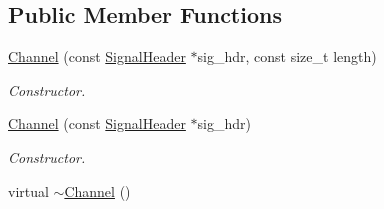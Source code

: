 \subsection*{Public Member Functions}
\begin{DoxyCompactItemize}
\item 
\hypertarget{classgdf_1_1_channel_ac2b2017a6e756749a16af2b9c8509cc0}{
\hyperlink{classgdf_1_1_channel_ac2b2017a6e756749a16af2b9c8509cc0}{Channel} (const \hyperlink{classgdf_1_1_signal_header}{SignalHeader} $\ast$sig\_\-hdr, const size\_\-t length)}
\label{classgdf_1_1_channel_ac2b2017a6e756749a16af2b9c8509cc0}

\begin{DoxyCompactList}\small\item\em Constructor. \item\end{DoxyCompactList}\item 
\hyperlink{classgdf_1_1_channel_af27f9328085d4b662d6039a9fa36b650}{Channel} (const \hyperlink{classgdf_1_1_signal_header}{SignalHeader} $\ast$sig\_\-hdr)
\begin{DoxyCompactList}\small\item\em Constructor. \item\end{DoxyCompactList}\item 
\hypertarget{classgdf_1_1_channel_ac8a48799dbf99cd2d6c93c1de2985d1d}{
virtual \hyperlink{classgdf_1_1_channel_ac8a48799dbf99cd2d6c93c1de2985d1d}{$\sim$Channel} ()}
\label{classgdf_1_1_channel_ac8a48799dbf99cd2d6c93c1de2985d1d}


\end{DoxyCompactItemize}
